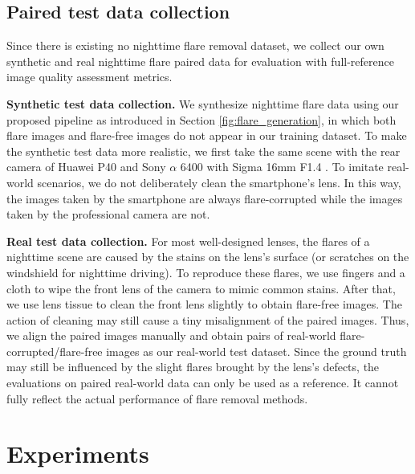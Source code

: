 \documentclass{article}
\newcommand{\yuekun}[1]{{\color{black}{#1}}}
\begin{document}
\subsection{Paired test data collection}
Since there is existing no nighttime flare removal dataset, we collect our own synthetic and real nighttime flare paired data for evaluation with full-reference image quality assessment metrics. 

\noindent
\textbf{Synthetic test data collection.} 
We synthesize nighttime flare data using our proposed pipeline as introduced in Section \ref{fig:flare_generation}, in which both flare images and flare-free images do not appear in our training dataset. 
To make the synthetic test data more realistic, we first take the same scene with the rear camera of Huawei P40 \yuekun{(smartphone camera)} and Sony $\alpha$ 6400 with Sigma 16mm F1.4 \yuekun{(professional camera)}. 
To imitate real-world scenarios, we do not deliberately clean the smartphone's lens. 
In this way, the images taken by the smartphone are always flare-corrupted while the images taken by the professional camera are not.
\yuekun{Referring to these flare-corrupted images, we synthesize flare images and add them to the images captured by the professional camera to compose flare-free/flare-corrupted pairs.
At last, we synthesize 100 pairs of data for the test.} 

\noindent
\textbf{Real test data collection.} 
For most well-designed lenses, the flares of a nighttime scene are caused by the stains on the lens's surface (or scratches on the windshield for nighttime driving). 
To reproduce these flares, we use fingers and a cloth to wipe the front lens of the camera to mimic common stains. 
After that, we use lens tissue to clean the front lens slightly to obtain flare-free images.
The action of cleaning may still cause a tiny misalignment of the paired images. 
Thus, we align the paired images manually and obtain \yuekun{100} pairs of real-world flare-corrupted/flare-free images as our real-world test dataset. 
Since the ground truth may still be influenced by the slight flares brought by the lens's defects, the evaluations on paired real-world data can only be used as a reference. 
It cannot fully reflect the actual performance of flare removal methods. 

\vspace{-3mm}
\section{Experiments}
\label{experiments}
\vspace{-2mm}
\yuekun{
To demonstrate the effectiveness and advantages of our dataset, we compare the performance of different datasets and methods for nighttime flare removal.
We also present a benchmark of the existing image restoration methods on our dataset.
}
\end{document}
